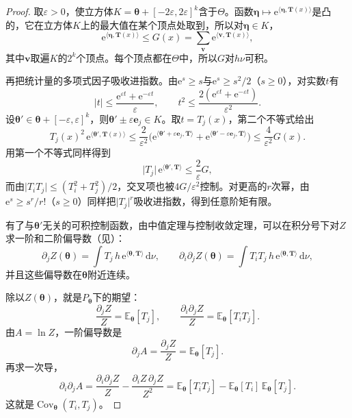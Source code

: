 \begin{proof}
取$\varepsilon>0$，使立方体$K=\bm{\theta}+[-2\varepsilon,2\varepsilon]^{k}$含于$\Theta$。函数$\bm{\eta}\mapsto\mathrm{e}^{\langle\bm{\eta},\bm{T}(x)\rangle}$是凸的，它在立方体$K$上的最大值在某个顶点处取到，所以对$\bm{\eta}\in K$，
\[
  \mathrm{e}^{\langle\bm{\eta},\bm{T}(x)\rangle}\leq G(x)=\sum_{\bm{v}}\mathrm{e}^{\langle\bm{v},\bm{T}(x)\rangle},
\]
其中$\bm{v}$取遍$K$的$2^{k}$个顶点。每个顶点都在$\Theta$中，所以$G$对$h\nu$可积。

再把统计量的多项式因子吸收进指数。由$\mathrm{e}^{s}\geq s$与$\mathrm{e}^{s}\geq s^{2}/2$（$s\geq0$），对实数$t$有
\[
  \lvert t\rvert\leq\frac{\mathrm{e}^{\varepsilon t}+\mathrm{e}^{-\varepsilon t}}{\varepsilon},\qquad t^{2}\leq\frac{2(\mathrm{e}^{\varepsilon t}+\mathrm{e}^{-\varepsilon t})}{\varepsilon^{2}} .
\]
设$\bm{\theta}'\in\bm{\theta}+[-\varepsilon,\varepsilon]^{k}$，则$\bm{\theta}'\pm\varepsilon\bm{e}_j\in K$。取$t=T_j(x)$，第二个不等式给出
\[
  T_j(x)^{2}\,\mathrm{e}^{\langle\bm{\theta}',\bm{T}(x)\rangle}\leq\frac{2}{\varepsilon^{2}}\bigl(\mathrm{e}^{\langle\bm{\theta}'+\varepsilon\bm{e}_j,\bm{T}\rangle}+\mathrm{e}^{\langle\bm{\theta}'-\varepsilon\bm{e}_j,\bm{T}\rangle}\bigr)\leq\frac{4}{\varepsilon^{2}}G(x).
\]
用第一个不等式同样得到
\[
  \lvert T_j\rvert\,\mathrm{e}^{\langle\bm{\theta}',\bm{T}\rangle}\leq\frac{2}{\varepsilon}G ,
\]
而由$\lvert T_iT_j\rvert\leq(T_i^{2}+T_j^{2})/2$，交叉项也被$4G/\varepsilon^{2}$控制。对更高的$r$次幂，由$\mathrm{e}^{s}\geq s^{r}/r!$（$s\geq0$）同样把$\lvert T_j\rvert^{r}$吸收进指数，得到任意阶矩有限。

有了与$\bm{\theta}'$无关的可积控制函数，由中值定理与控制收敛定理，可以在积分号下对$Z$求一阶和二阶偏导数（见）：
\[
  \partial_jZ(\bm{\theta})=\int T_j\,h\,\mathrm{e}^{\langle\bm{\theta},\bm{T}\rangle}\,\mathrm{d}\nu,\qquad\partial_i\partial_jZ(\bm{\theta})=\int T_iT_j\,h\,\mathrm{e}^{\langle\bm{\theta},\bm{T}\rangle}\,\mathrm{d}\nu ,
\]
并且这些偏导数在$\bm{\theta}$附近连续。

除以$Z(\bm{\theta})$，就是$P_{\bm{\theta}}$下的期望：
\[
  \frac{\partial_jZ}{Z}=\mathbb{E}_{\bm{\theta}}[T_j],\qquad\frac{\partial_i\partial_jZ}{Z}=\mathbb{E}_{\bm{\theta}}[T_iT_j].
\]
由$A=\ln Z$，一阶偏导数是
\[
  \partial_jA=\frac{\partial_jZ}{Z}=\mathbb{E}_{\bm{\theta}}[T_j].
\]
再求一次导，
\[
  \partial_i\partial_jA=\frac{\partial_i\partial_jZ}{Z}-\frac{\partial_iZ\,\partial_jZ}{Z^{2}}=\mathbb{E}_{\bm{\theta}}[T_iT_j]-\mathbb{E}_{\bm{\theta}}[T_i]\,\mathbb{E}_{\bm{\theta}}[T_j].
\]
这就是$\operatorname{Cov}_{\bm{\theta}}(T_i,T_j)$。
\end{proof}

